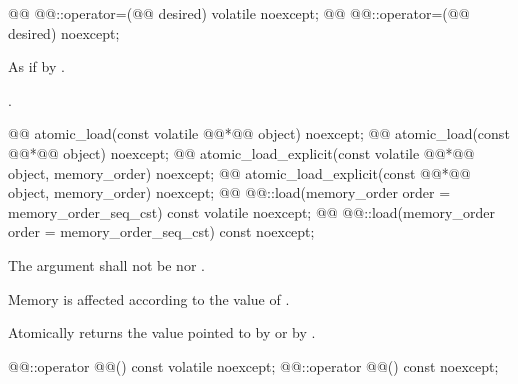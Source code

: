 %
%
\begin{itemdecl}
@@ @@::operator=(@@ desired) volatile noexcept;
@@ @@::operator=(@@ desired) noexcept;
\end{itemdecl}

\begin{itemdescr}
\pnum
\effects As if by .

\pnum
\returns {}.
\end{itemdescr}

%
%
%
%
%
%
\begin{itemdecl}
@@ atomic_load(const volatile @@*@\itcorr[-1]@ object) noexcept;
@@ atomic_load(const @@*@\itcorr[-1]@ object) noexcept;
@@ atomic_load_explicit(const volatile @@*@\itcorr[-1]@ object, memory_order) noexcept;
@@ atomic_load_explicit(const @@*@\itcorr[-1]@ object, memory_order) noexcept;
@@ @@::load(memory_order order = memory_order_seq_cst) const volatile noexcept;
@@ @@::load(memory_order order = memory_order_seq_cst) const noexcept;
\end{itemdecl}

\begin{itemdescr}
\pnum
\requires The  argument shall not be  nor .

\pnum
\effects Memory is affected according to the value of .

\pnum
\returns Atomically returns the value pointed to by  or by .
\end{itemdescr}

%
%
\begin{itemdecl}
@@::operator @@() const volatile noexcept;
@@::operator @@() const noexcept;
\end{itemdecl}

